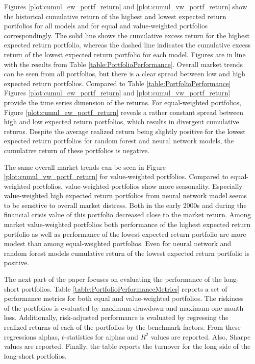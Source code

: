 \documentclass[12pt]{article}
\begin{document}
Figures \ref{plot:cumul_ew_portf_return} and \ref{plot:cumul_vw_portf_return} show the historical cumulative return of the highest and lowest expected return portfolios for all models and for equal and value-weighted portfolios correspondingly. The solid line shows the cumulative excess return for the highest expected return portfolio, whereas the dashed line indicates the cumulative excess return of the lowest expected return portfolio for each model. Figures are in line with the results from Table \ref{table:PortfolioPerformance}. Overall market trends can be seen from all portfolios, but there is a clear spread between low and high expected return portfolios. Compared to Table \ref{table:PortfolioPerformance} Figures \ref{plot:cumul_ew_portf_return} and \ref{plot:cumul_vw_portf_return} provide the time series dimension of the returns. For equal-weighted portfolios, Figure \ref{plot:cumul_ew_portf_return} reveals a rather constant spread between high and low expected return portfolios, which results in divergent cumulative returns. Despite the average realized return being slightly positive for the lowest expected return portfolios for random forest and neural network models, the cumulative return of these portfolios is negative. \par

The same overall market trends can be seen in Figure \ref{plot:cumul_vw_portf_return} for value-weighted portfolios. Compared to equal-weighted portfolios, value-weighted portfolios show more seasonality. Especially value-weighted high expected return portfolios from neural network model seems to be sensitive to overall market distress. Both in the early 2000s and during the financial crisis value of this portfolio decreased close to the market return. Among market value-weighted portfolios both performance of the highest expected return portfolio as well as performance of the lowest expected return portfolio are more modest than among equal-weighted portfolios. Even for neural network and random forest models cumulative return of the lowest expected return portfolio is positive. \par

The next part of the paper focuses on evaluating the performance of the long-short portfolios. Table \ref{table:PortfolioPerformanceMetrics} reports a set of performance metrics for both equal and value-weighted portfolios. The riskiness of the portfolios is evaluated by maximum drawdown and maximum one-month loss. Additionally, risk-adjusted performance is evaluated by regressing the realized returns of each of the portfolios by the benchmark factors. From these regressions alphas, $t$-statistics for alphas and $R^2$ values are reported. Also, Sharpe values are reported. Finally, the table reports the turnover for the long side of the long-short portfolios. \par
\end{document}
